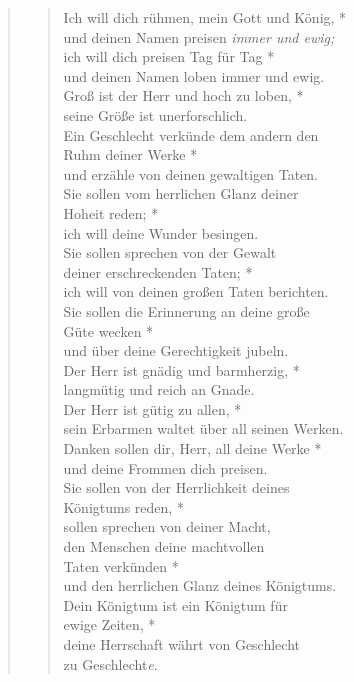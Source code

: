 \vspace{0.3cm}

\begin{quote}
\begin{verse}
 Ich will dich rühmen, mein Gott und König, *\\
und deinen Namen preisen \textit{immer und ewig;}\\
\vin ich will dich preisen Tag für Tag *\\
\vin und deinen Namen loben immer und ewig. \\
Groß ist der Herr und hoch zu loben, *\\
seine Größe ist unerforschlich. \\
\vin Ein Geschlecht verkünde dem andern den \\ \vin Ruhm deiner Werke *\\
\vin und erzähle von deinen gewaltigen Taten. \\
Sie sollen vom herrlichen Glanz deiner \\ Hoheit reden; *\\
ich will deine Wunder besingen.\\
\vin Sie sollen sprechen von der Gewalt\\ \vin  deiner erschreckenden Taten; *\\
\vin ich will von deinen großen Taten berichten.\\
Sie sollen die Erinnerung an deine große \\ Güte wecken *\\
und über deine Gerechtigkeit jubeln.\\
\vin Der Herr ist gnädig und barmherzig, *\\
\vin langmütig und reich an Gnade. \\
Der Herr ist gütig zu allen, *\\
sein Erbarmen waltet über all seinen Werken. \\
\vin Danken sollen dir, Herr, all deine Werke *\\
\vin und deine Frommen dich preisen. \\
Sie sollen von der Herrlichkeit deines \\ Königtums reden, *\\
sollen sprechen von deiner Macht, \\
\vin den Menschen deine machtvollen \\ \vin Taten verkünden *\\
\vin und den herrlichen Glanz deines Königtums. \\
Dein Königtum ist ein Königtum für\\ ewige Zeiten, *\\
deine Herrschaft währt von Geschlecht\\ zu Geschlecht\textit{e}.\\ 
\end{verse}

\end{quote}


